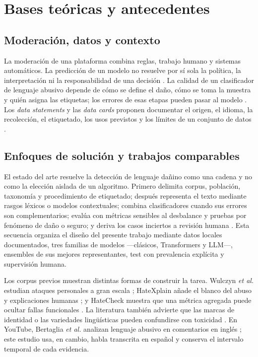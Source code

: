\section{Bases teóricas y antecedentes}

\subsection{Moderación, datos y contexto}

La moderación de una plataforma combina reglas, trabajo humano y sistemas automáticos. La predicción de un modelo no resuelve por sí sola la política, la interpretación ni la responsabilidad de una decisión \cite{gorwa2020moderation}. La calidad de un clasificador de lenguaje abusivo depende de cómo se define el daño, cómo se toma la muestra y quién asigna las etiquetas; los errores de esas etapas pueden pasar al modelo \cite{vidgen2020directions}. Los \emph{data statements} y las \emph{data cards} proponen documentar el origen, el idioma, la recolección, el etiquetado, los usos previstos y los límites de un conjunto de datos \cite{bender2018datastatements,pushkarna2022datacards}.

\subsection{Enfoques de solución y trabajos comparables}

El estado del arte resuelve la detección de lenguaje dañino como una cadena y no como la elección aislada de un algoritmo. Primero delimita corpus, población, taxonomía y procedimiento de etiquetado; después representa el texto mediante rasgos léxicos o modelos contextuales; combina clasificadores cuando sus errores son complementarios; evalúa con métricas sensibles al desbalance y pruebas por fenómeno de daño o seguro; y deriva los casos inciertos a revisión humana \cite{vidgen2020directions,bender2018datastatements,sparckjones1972idf,vaswani2017attention,dietterich2000ensemble,rottger2021hatecheck,mozannar2020defer}. Esta secuencia organiza el diseño del presente trabajo mediante datos locales documentados, tres familias de modelos ---clásicos, Transformers y LLM---, ensembles de sus mejores representantes, test con prevalencia explícita y supervisión humana.

Los corpus previos muestran distintas formas de construir la tarea. Wulczyn \emph{et al.} estudian ataques personales a gran escala \cite{wulczyn2017exmachina}; HateXplain añade el blanco del abuso y explicaciones humanas \cite{mathew2021hatexplain}; y HateCheck muestra que una métrica agregada puede ocultar fallas funcionales \cite{rottger2021hatecheck}. La literatura también advierte que las marcas de identidad o las variedades lingüísticas pueden confundirse con toxicidad \cite{sap2019racialbias}. En YouTube, Bertaglia \emph{et al.} analizan lenguaje abusivo en comentarios en inglés \cite{bertaglia2021youtube}; este estudio usa, en cambio, habla transcrita en español y conserva el intervalo temporal de cada evidencia.

